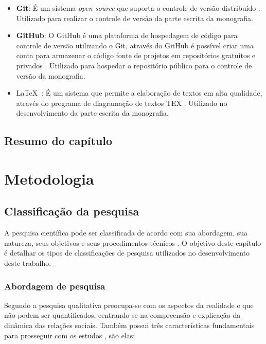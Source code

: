 \begin{itemize}
	\item \textbf{Git}: É um sistema \textit{open source} que suporta o controle de versão distribuído \cite{git}. Utilizado para realizar o controle de versão da parte escrita da monografia. 
	\item \textbf{GitHub}: O GitHub é uma plataforma de hospedagem de código para controle de versão utilizando o Git, através do GitHub é possível criar uma conta para armazenar o código fonte de projetos em repositórios gratuitos e privados \cite{github}. Utilizado para hospedar o repositório público para o controle de versão da monografia. 
	\item \LaTeX\ : É um sistema que permite a elaboração de textos em alta qualidade, através do programa de diagramação de textos TEX \cite{latex}. Utilizado no desenvolvimento da parte escrita da monografia. 
\end{itemize}

\section{Resumo do capítulo}

\chapter{Metodologia}

\section{Classificação da pesquisa}

A pesquisa científica pode ser classificada de acordo com sua abordagem, sua natureza, seus objetivos e seus procedimentos técnicos \cite{gerhardt2009metodos}. O objetivo deste capítulo é detalhar os tipos de classificações de pesquisa utilizados no desenvolvimento deste trabalho. 

\subsection{Abordagem de pesquisa}

Segundo \cite{gerhardt2009metodos} a pesquisa qualitativa preocupa-se com os aspectos da realidade e que não podem ser quantificados, centrando-se na compreensão e explicação da dinâmica das relações sociais. Também possui três características fundamentais para prosseguir com os estudos \cite{mazzotti1991planejamento}, são elas:

